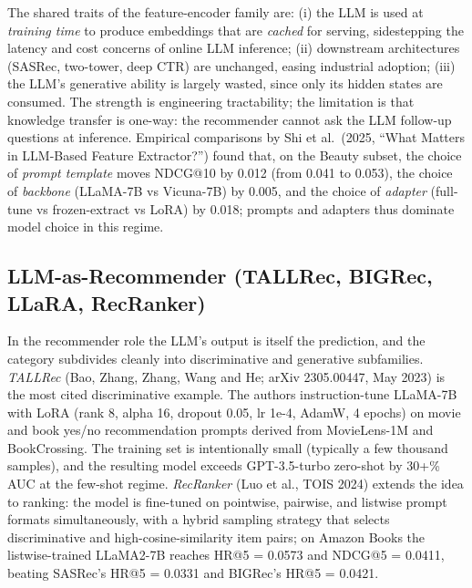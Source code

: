 The shared traits of the feature-encoder family are: (i) the LLM is used at \emph{training time} to produce embeddings that are \emph{cached} for serving, sidestepping the latency and cost concerns of online LLM inference; (ii) downstream architectures (SASRec, two-tower, deep CTR) are unchanged, easing industrial adoption; (iii) the LLM's generative ability is largely wasted, since only its hidden states are consumed. The strength is engineering tractability; the limitation is that knowledge transfer is one-way: the recommender cannot ask the LLM follow-up questions at inference. Empirical comparisons by Shi et al.~(2025, ``What Matters in LLM-Based Feature Extractor?'') found that, on the Beauty subset, the choice of \emph{prompt template} moves NDCG@10 by 0.012 (from 0.041 to 0.053), the choice of \emph{backbone} (LLaMA-7B vs Vicuna-7B) by 0.005, and the choice of \emph{adapter} (full-tune vs frozen-extract vs LoRA) by 0.018; prompts and adapters thus dominate model choice in this regime.

\subsection{LLM-as-Recommender (TALLRec, BIGRec, LLaRA, RecRanker)}\label{llm-as-recommender-tallrec-bigrec-llara-recranker}

In the recommender role the LLM's output is itself the prediction, and the category subdivides cleanly into discriminative and generative subfamilies. \emph{TALLRec} (Bao, Zhang, Zhang, Wang and He; arXiv 2305.00447, May 2023) is the most cited discriminative example. The authors instruction-tune LLaMA-7B with LoRA (rank 8, alpha 16, dropout 0.05, lr 1e-4, AdamW, 4 epochs) on movie and book yes/no recommendation prompts derived from MovieLens-1M and BookCrossing. The training set is intentionally small (typically a few thousand samples), and the resulting model exceeds GPT-3.5-turbo zero-shot by 30+\% AUC at the few-shot regime. \emph{RecRanker} (Luo et al., TOIS 2024) extends the idea to ranking: the model is fine-tuned on pointwise, pairwise, and listwise prompt formats simultaneously, with a hybrid sampling strategy that selects discriminative and high-cosine-similarity item pairs; on Amazon Books the listwise-trained LLaMA2-7B reaches HR@5 = 0.0573 and NDCG@5 = 0.0411, beating SASRec's HR@5 = 0.0331 and BIGRec's HR@5 = 0.0421.

